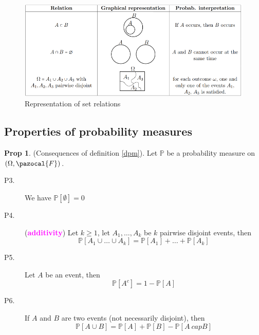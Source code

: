 \documentclass[8pt,a4paper,landscape]{article}
\theoremstyle{definition}
\theoremstyle{example}
\theoremstyle{intuition}
\theoremstyle{definition}
\newtheorem{proposition}{Prop}[section]
\newcommand{\Fb}{\pazocal{F}}
\newcommand{\mydef}[1]{\textcolor{magenta}{\textbf{#1}}}
\newcommand{\prob}[1]{\mathbb{P}\left[ #1 \right]}
\begin{document}
\begin{multicols}{3}
				
				\begin{figure}[H]
					\includegraphics[width=\linewidth]{set-relations-representation.png}
					\caption{Representation of set relations}
				\end{figure}
				
				
			\subsection{Properties of probability measures}
			
				\begin{proposition}	
					(Consequences of definition \ref{dpm}). Let $\mathbb{P}$ be a probability measure on $(\Omega, \Fb)$.
					\begin{description}
						\item[P3.] We have $\mathbb{P}\left[\emptyset\right] = 0$
						\item[P4.] (\mydef{additivity}) Let $k \geq 1$, let $A_1, \ldots , A_k$ be $k$ pairwise disjoint events, then 
							$$
								\mathbb{P}\left[A_1 \cup \ldots \cup A_k \right] = \prob{A_1} + \ldots + \mathbb{P}\left[ A_k \right]
							$$
						\item[P5.] Let $A$ be an event, then
							$$
								\prob{A^c} = 1 - \prob{A}
							$$
						\item[P6.] If $A$ and $B$ are two events (not necessarily disjoint), then 
							$$
								\prob{A \cup B} = \prob{A} + \prob{B} - \prob{A \ cap B}
							$$
					\end{description}
				\end{proposition}
				

\end{multicols}
\end{document}
